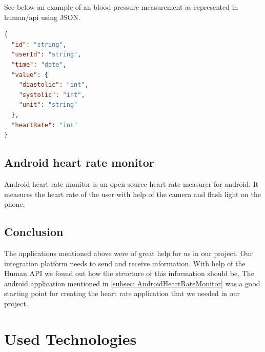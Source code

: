 


See below an example of an blood pressure measurement as represented in human/api using JSON.

\begin{lstlisting}[language=json]
{
  "id": "string",
  "userId": "string",
  "time": "date",
  "value": {
    "diastolic": "int",
    "systolic": "int",
    "unit": "string"
  },
  "heartRate": "int"
}
\end{lstlisting}

\subsection{Android heart rate monitor} \nocite{AndroidHeartRateMonitor}
\label{subsec: AndroidHeartRateMonitor}

Android heart rate monitor is an open source heart rate measurer for android.
It measures the heart rate of the user with help of the camera and flash light on the phone.

\subsection{Conclusion}

The applications mentioned above were of great help for us in our project.
Our integration platform needs to send and receive information. 
With help of the Human API we found out how the structure of this information should be.
The android application mentioned in \ref{subsec: AndroidHeartRateMonitor} was a good starting point for creating the heart rate application that we needed in our project.


\section{Used Technologies}
\label{section:used-technologies}

